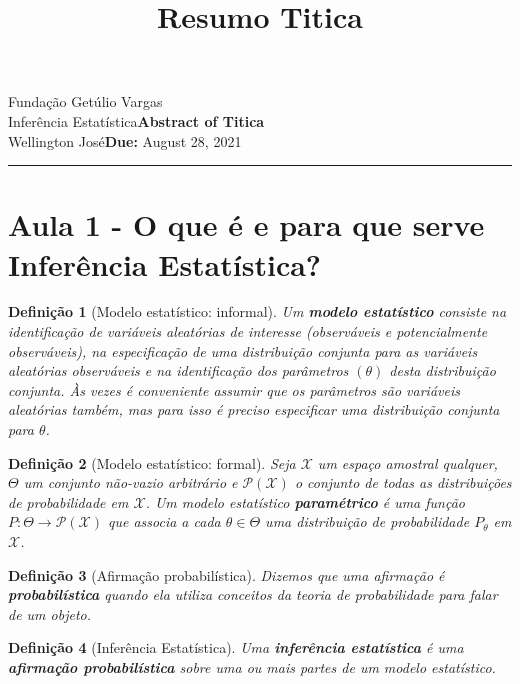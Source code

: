 \documentclass{article}
\title{Resumo Titica}
\date{}
\newtheorem{definition}{Definição}
\newcommand{\assignment}{Abstract of Titica}
\newcommand{\duedate}{August 28, 2021}
\begin{document}
Fundação Getúlio Vargas\hfill\\
Inferência Estatística\hfill\textbf{\assignment}\\
Wellington José\hfill\textbf{Due:} \duedate\\
\smallskip\hrule\bigskip

{\let\newpage\relax\maketitle}
\maketitle

\section*{Aula 1 - O que é e para que serve Inferência Estatística?}

\begin{definition}[Modelo estatístico: informal]
Um \textbf{modelo estatístico} consiste na identificação de variáveis aleatórias de interesse (observáveis e potencialmente observáveis), na especificação de uma distribuição conjunta para as variáveis aleatórias observáveis e na identificação dos parâmetros $(\theta)$ desta distribuição conjunta. Às vezes é conveniente assumir que os parâmetros são variáveis aleatórias também, mas para isso é preciso especificar uma distribuição conjunta para $\theta$.
\end{definition}

\begin{definition}[Modelo estatístico: formal]
Seja $\mathcal{X}$ um espaço amostral qualquer, $\Theta$ um conjunto não-vazio arbitrário e $\mathcal{P(X)}$ o conjunto de todas as distribuições de probabilidade em $\mathcal{X}$. Um modelo estatístico \textbf{paramétrico} é uma função $P: \Theta \rightarrow \mathcal{P(X)}$ que associa a cada $\theta \in \Theta$ uma distribuição de probabilidade $P_\theta$ em $\mathcal{X}$.
\end{definition}

\begin{definition}[Afirmação probabilística]
Dizemos que uma afirmação é \textbf{probabilística} quando ela utiliza conceitos da teoria de probabilidade para falar de um objeto.
\end{definition}

\begin{definition}[Inferência Estatística]
Uma \textbf{inferência estatística} é uma \textbf{afirmação probabilística} sobre uma ou mais partes de um modelo estatístico.
\end{definition}
\end{document}
